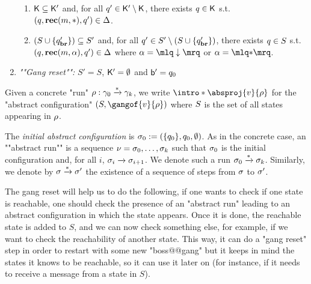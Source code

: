 \begin{definition}
\begin{enumerate}
\begin{enumerate}[label = (\arabic*)]
			\item\label{item:external_broadcast_clique}$\mathsf{K} \subseteq \mathsf{K}'$ and, for all $q' \in \mathsf{K}' \setminus \mathsf{K}$, there exists $q \in \mathsf{K}$ s.t. $(q, \textbf{rec}(m, {*}), q') \in \Delta$.
			
			\item\label{item:external_broadcast_covset}$(S \cup \{q_{\textbf{br}}'\}) \subseteq S'$ and, for all $q' \in S' \setminus (S \cup \{q_{\textbf{br}}'\})$, there exists $q \in S$ s.t. $(q, \textbf{rec}(m, \alpha), q') \in \Delta$ where $\anact = \quotemarks{\enregact}$ or $\anact = \quotemarks{\dummyact}$.
		\end{enumerate}
		\item \emph{""Gang reset"":} $S' = S$, $\mathsf{K}' = \emptyset$ and $\mathsf{b}'= q_0$
	\end{enumerate}
	
	
	Given a concrete "run" $\rho: \gamma_0 \xrightarrow{*} \gamma_k$, we write \AP  $\intro*\absproj{\aval}{\run}$ for the "abstract configuration" $(\covset, \gangof{\aval}{\run})$ where $S$ is the set of all states appearing in $\rho$. 
	
	The \emph{initial abstract configuration} is $\sigma_0 := (\{q_0\}, q_0, \emptyset)$. 
	As in the concrete case, an ""abstract run"" is a sequence $\nu = \sigma_0, \dots, \sigma_k$ such that $\sigma_0$ is the initial configuration and, for all $i$, $\sigma_i \xrightarrow{} \sigma_{i+1}$. We denote such a run $\sigma_0 \xrightarrow{*} \sigma_k$. Similarly, we denote by $\sigma \xrightarrow{*} \sigma'$ the existence of a sequence of steps from $\sigma$ to $\sigma'$.
\end{definition}

The gang reset will help us to do the following, if one wants to check if one state is reachable, one should check the presence of an "abstract run" leading to an abstract configuration in which the state appears. Once it is done, the reachable state is added to $S$, and we can  now check something else, for example, if we want to check the reachability of another state. This way, it can do a "gang reset" step in order to restart with some new "boss@@gang" but it keeps in mind the states it knows to be reachable, so it can use it later on (for instance, if it needs to receive a message from a state in $S$).

